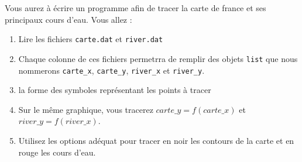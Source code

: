 Vous aurez à écrire un programme afin de tracer la carte de france et ses principaux cours d'eau.
Vous allez : 

\begin{enumerate}
\item Lire les fichiers \texttt{carte.dat} et \texttt{river.dat}
\item Chaque colonne de ces fichiers permetrra de remplir des objets \texttt{list} que nous nommerons
  \texttt{carte\_x},  \texttt{carte\_y},  \texttt{river\_x} et \texttt{river\_y}.
\item la forme des  symboles représentant les points à tracer

\item Sur le même graphique, vous tracerez $carte\_y = f(carte\_x)$ et $river\_y = f(river\_x)$.

\item Utilisez les options adéquat pour tracer en noir les contours de la carte et en rouge les cours d'eau.


\end{enumerate}




\vfill
